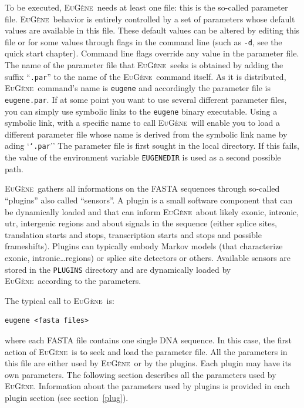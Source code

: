 \documentclass[a4paper,titlepage]{report}
\newcommand{\EuGene}{\textsc{EuG\`ene}}
\begin{document}
To be executed, \EuGene\ needs at least one file: this is the
so-called parameter file. \EuGene\ behavior is entirely controlled
by a set of parameters whose default values are available in this
file. These default values can be altered by editing this file or for
some values through flags in the command line (such as \texttt{-d},
see the quick start chapter). Command line flags override any value in the parameter
file. The name of the parameter file that \EuGene\ seeks is obtained
by adding the suffix ``\texttt{.par}'' to the name of the \EuGene\ 
command itself.  As it is distributed, \EuGene\ command's name is
\texttt{eugene} and accordingly the parameter file is
\texttt{eugene.par}. If at some point you want to use several
different parameter files, you can simply use symbolic links to the
\texttt{eugene} binary executable. Using a symbolic link, with a
specific name to call \EuGene\ will enable you to load a different
parameter file whose name is derived from the symbolic link name by
ading `\texttt{`.par}'' The parameter file is first sought in the
local directory.  If this fails, the value of the environment variable
\texttt{EUGENEDIR} is used as a second possible path.

\EuGene\ gathers all informations on the FASTA sequences through
so-called ``plugins'' also called ``sensors''. A plugin is a small
software component that can be dynamically loaded and that can inform
\EuGene\ about likely exonic, intronic, utr, intergenic regions and
about signals in the sequence (either splice sites, translation starts
and stops, transcription starts and stops and possible frameshifts).
Plugins can typically embody Markov models (that characterize exonic,
intronic\ldots regions) or splice site detectors or others.  Available
sensors are stored in the \texttt{PLUGINS} directory and are
dynamically loaded by \EuGene\ according to the parameters.

The typical call to \EuGene\ is:

\begin{Verbatim}[fontsize=\small]
eugene <fasta files>
\end{Verbatim}

where each FASTA file contains one single DNA sequence. In this case,
the first action of \EuGene\ is to seek and load the parameter file.
All the parameters in this file are either used by \EuGene\ or by the
plugins. Each plugin may have its own parameters. The following
section describes all the parameters used by \EuGene. Information
about the parameters used by plugins is provided in each plugin
section (see section~\ref{plug}).
\end{document}
